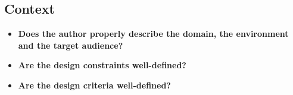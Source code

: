 \subsection{Context}
\begin{itemize}
\item {\bf Does the author properly describe the domain, the environment and the target audience?}\\ 

\item {\bf Are the design constraints well-defined?}\\ 

\item {\bf Are the design criteria well-defined?}\\ 

\end{itemize}